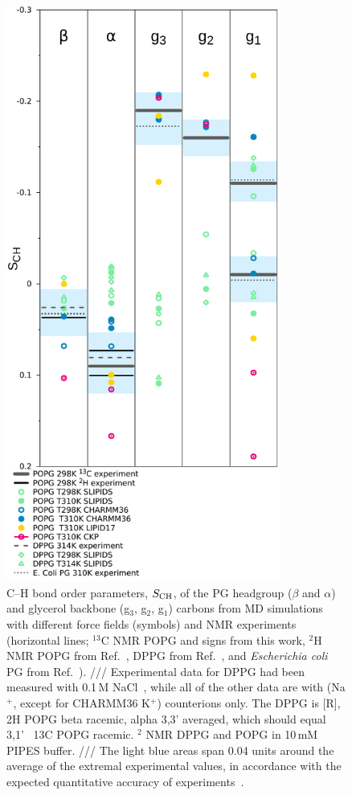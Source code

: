 \documentclass[journal=jpcbfk]{achemso}
\begin{document}
\begin{figure}[!h]
  \centering
  \includegraphics[width=9.0cm]{./Figs/HGorderparametersPG.pdf}
  \caption{\label{HGorderParametersPOPG}
    C--H bond order parameters, $S_{\rm CH}$, of the PG headgroup ($\beta$ and $\alpha$) and
    glycerol backbone (g$_3$, g$_2$, g$_1$) carbons
    from MD simulations with different force fields (symbols) and
    NMR experiments (horizontal lines;
    $^{13}$C NMR POPG and signs from this work,
    $^2$H NMR POPG from Ref.~, %
    DPPG from Ref.~, %
    and {\it Escherichia coli} PG from Ref.~).
    ///
    Experimental data for DPPG had been measured with 0.1\,M NaCl~\cite{wohlgemuth80}, while all of the other data are with
    (Na$^+$, except for CHARMM36 K$^+$) counterions only.
    The DPPG is [R],
    2H POPG beta racemic, alpha 3,3' averaged, which should equal 3,1'~\cite{wohlgemuth80}
    13C POPG racemic.
    $^2$ NMR DPPG and POPG in 10\,mM PIPES buffer.
    ///
    The light blue areas span 0.04 units around the average of the extremal experimental values,
    in accordance with the expected quantitative accuracy of experiments~\cite{ollila16}.
  }
\end{figure}
\end{document}
